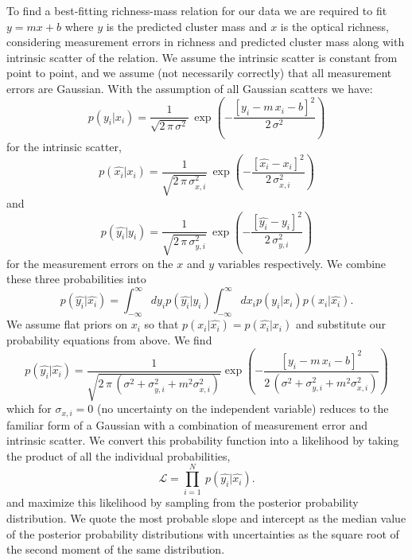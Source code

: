 To find a best-fitting richness-mass relation for our data we are required to fit $y=mx+b$ where $y$ is the predicted cluster mass and $x$ is the optical richness, considering measurement errors in richness and predicted cluster mass along with intrinsic scatter of the relation. We assume the intrinsic scatter is constant from point to point, and we assume (not necessarily correctly) that all measurement errors are Gaussian. With the assumption of all Gaussian scatters we have:
\begin{equation}\label{2eqn:intrinsic scatter}
	p(y_i|x_i) = \frac{1}{\sqrt{2\,\pi\,\sigma^2}}
	 \,\exp\left(-\frac{[y_i - m\,x_i - b]^2}{2\,\sigma^2}\right)
\end{equation}
for the intrinsic scatter,
\begin{equation}\label{2eqn:xerr}
	p(\hat{x_i}|x_i) = \frac{1}{\sqrt{2\,\pi\,\sigma_{x,i}^2}}
	 \,\exp\left(-\frac{[\hat{x_i} - x_i]^2}{2\,\sigma_{x,i}^2}\right)
\end{equation}
and
\begin{equation}\label{2eqn:yerr}
	p(\hat{y_i}|y_i) = \frac{1}{\sqrt{2\,\pi\,\sigma_{y,i}^2}}
	 \,\exp\left(-\frac{[\hat{y_i} -y_i]^2}{2\,\sigma_{y,i}^2}\right)
\end{equation}
for the measurement errors on the $x$ and $y$ variables respectively. We combine these three probabilities into
\begin{equation}
	p(\hat{y_i}|\hat{x_i}) = \int_{-\infty}^\infty dy_ip(\hat{y_i}|y_i) \int_{-\infty}^\infty dx_ip(y_i|x_i)p(x_i|\hat{x_i}).
\end{equation}
We assume flat priors on $x_i$ so that $p(x_i|\hat{x_i}) = p(\hat{x_i}|x_i)$ and substitute our probability equations from above. We find
\begin{equation}
	p(\hat{y_i}|\hat{x_i}) =
	\frac{1}{\sqrt{2\,\pi\,(\sigma^2 + \sigma_{y,i}^2 + m^2\sigma_{x,i}^2)}}\exp\left(-\frac{[y_i - m\,x_i - b]^2}{2\,(\sigma^2 + \sigma_{y,i}^2 + m^2\sigma_{x,i}^2)}\right)
\end{equation}
which for $\sigma_{x,i}=0$ (no uncertainty on the independent variable) reduces to the familiar form of a Gaussian with a combination of measurement error and intrinsic scatter. We convert this probability function into a likelihood by taking the product of all the individual probabilities,  
\begin{equation}\label{2eq:like}
\mathscr{L} = \prod_{i=1}^N \ p(\hat{y_i}|\hat{x_i}).
\end{equation}
and maximize this likelihood by sampling from the posterior probability distribution. We quote the most probable slope and intercept as the median value of the posterior probability distributions with uncertainties as the square root of the second moment of the same distribution.

